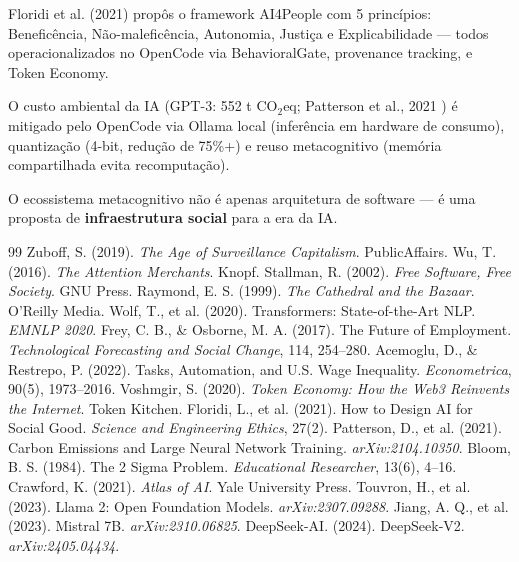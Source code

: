 Floridi et al. (2021) \cite{floridi2021ai4people} propôs o framework AI4People com 5 princípios: Beneficência, Não-maleficência, Autonomia, Justiça e Explicabilidade — todos operacionalizados no OpenCode via BehavioralGate, provenance tracking, e Token Economy.

O custo ambiental da IA (GPT-3: 552 t CO$_2$eq; Patterson et al., 2021 \cite{patterson2021carbon}) é mitigado pelo OpenCode via Ollama local (inferência em hardware de consumo), quantização (4-bit, redução de 75\%+) e reuso metacognitivo (memória compartilhada evita recomputação).

O ecossistema metacognitivo não é apenas arquitetura de software — é uma proposta de \textbf{infraestrutura social} para a era da IA.

\begin{thebibliography}{99}
 Zuboff, S. (2019). \textit{The Age of Surveillance Capitalism}. PublicAffairs.
 Wu, T. (2016). \textit{The Attention Merchants}. Knopf.
 Stallman, R. (2002). \textit{Free Software, Free Society}. GNU Press.
 Raymond, E. S. (1999). \textit{The Cathedral and the Bazaar}. O'Reilly Media.
 Wolf, T., et al. (2020). Transformers: State-of-the-Art NLP. \textit{EMNLP 2020}. 
 Frey, C. B., \& Osborne, M. A. (2017). The Future of Employment. \textit{Technological Forecasting and Social Change}, 114, 254--280. 
 Acemoglu, D., \& Restrepo, P. (2022). Tasks, Automation, and U.S. Wage Inequality. \textit{Econometrica}, 90(5), 1973--2016. 
 Voshmgir, S. (2020). \textit{Token Economy: How the Web3 Reinvents the Internet}. Token Kitchen.
 Floridi, L., et al. (2021). How to Design AI for Social Good. \textit{Science and Engineering Ethics}, 27(2). 
 Patterson, D., et al. (2021). Carbon Emissions and Large Neural Network Training. \textit{arXiv:2104.10350}. 
 Bloom, B. S. (1984). The 2 Sigma Problem. \textit{Educational Researcher}, 13(6), 4--16. 
 Crawford, K. (2021). \textit{Atlas of AI}. Yale University Press.
 Touvron, H., et al. (2023). Llama 2: Open Foundation Models. \textit{arXiv:2307.09288}. 
 Jiang, A. Q., et al. (2023). Mistral 7B. \textit{arXiv:2310.06825}. 
 DeepSeek-AI. (2024). DeepSeek-V2. \textit{arXiv:2405.04434}. 
\end{thebibliography}
